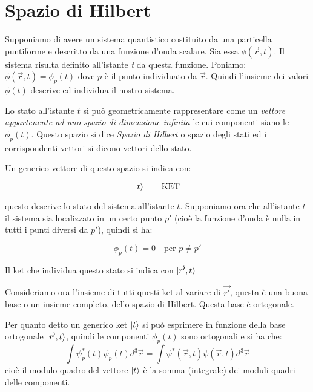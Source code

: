 \section{Spazio di Hilbert}

Supponiamo 
di avere un sistema quantistico costituito da una particella puntiforme e
descritto da una funzione d'onda scalare.
Sia essa $\phi(\vec{r},t)$. Il sistema risulta definito all'istante \textit{t}
da questa funzione. Poniamo:
$\phi(\vec{r},t) =\phi_{p}(t)$
dove $p$ è il punto individuato da $\vec{r}$. Quindi l'insieme dei valori
${\phi(t)}$ descrive ed individua il nostro sistema.

Lo stato all'istante $t$ si può geometricamente rappresentare come un
\textit{vettore appartenente ad uno spazio di dimensione infinita} le cui
componenti siano le $\phi_{p}(t)$. Questo spazio si dice \textit{Spazio di
Hilbert} o spazio degli stati ed i corrispondenti vettori si dicono vettori
dello stato.

Un generico vettore di questo spazio si indica con:

\begin{equation}
 \ket{t}  \qquad \text{KET}
\end{equation}%

questo descrive lo stato del sistema all'istante $t$.
Supponiamo ora che all'istante $t$ il sistema sia localizzato in un certo punto
$p'$ (cioè la funzione d'onda è nulla in tutti i punti diversi da $p'$), quindi
si ha:

\[
\phi_{p}(t)=0 \quad \text{per } p\neq p'
\]

Il ket che individua questo stato si indica con 
$\ket{\vec{r'},t}$

Consideriamo ora l'insieme di tutti questi ket al variare di $\vec{r'}$, questa
è una buona base o un insieme completo, dello spazio di Hilbert. Questa base è
ortogonale.

Per quanto detto un generico ket $\ket{t}$ si può esprimere in funzione della
base ortogonale $\ket{\vec{r'},t}$, quindi le componenti $\phi_{p}(t)$  sono
ortogonali e si ha che:
\begin{equation}
\int \psi^*_{p}(t)\psi_{p}(t) d^3\vec{r}= \int \psi^*(\vec{r},t)\psi(\vec{r},t)d^3\vec{r}%
\end{equation}
cioè il modulo quadro del vettore $\ket{t}$ è la somma (integrale) dei moduli
quadri delle componenti.


